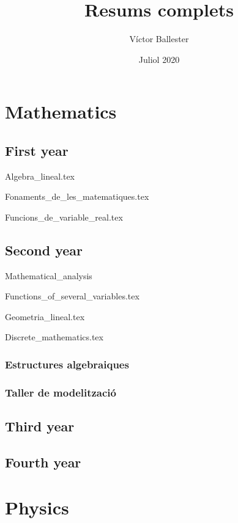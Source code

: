 \documentclass{article} %
\title{Resums complets}
\author{Víctor Ballester}
\date{Juliol 2020}
\begin{document}
\maketitle
\newpage
\tableofcontents
\newpage
\part{Mathematics}
    \chapter{First year}
        {Algebra_lineal.tex}
        \cleardoublepage
        
        {Fonaments_de_les_matematiques.tex}
        \cleardoublepage
        
        {Funcions_de_variable_real.tex}
        \cleardoublepage
    \chapter{Second year}
        {Mathematical_analysis}
        \cleardoublepage

        {Functions_of_several_variables.tex}
        \cleardoublepage
        
        {Geometria_lineal.tex}
        \cleardoublepage
        
        {Discrete_mathematics.tex}
        \cleardoublepage
        \section{Estructures algebraiques}
        \section{Taller de modelització}
    \chapter{Third year}
    \chapter{Fourth year}
\part{Physics}
\end{document}
